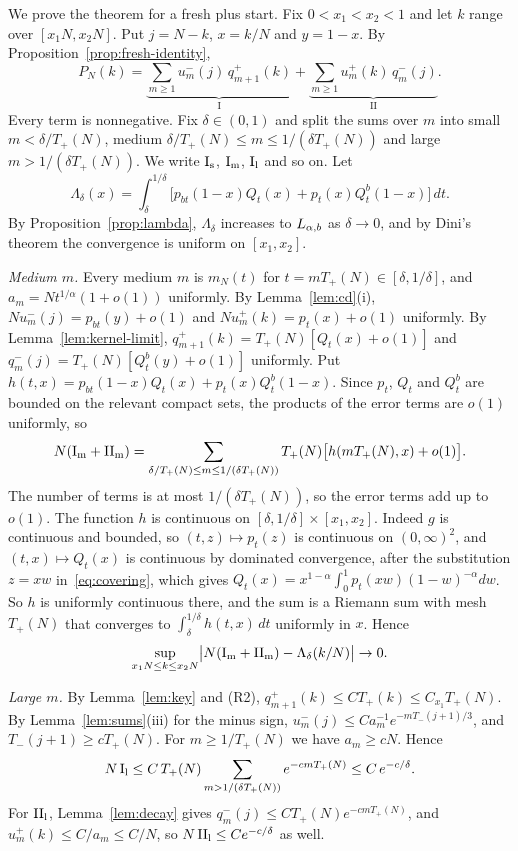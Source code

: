We prove the theorem for a fresh plus start. Fix
$0<x_1<x_2<1$ and let $k$ range over $[x_1N,x_2N]$. Put $j=N-k$, $x=k/N$ and $y=1-x$.
By Proposition~\ref{prop:fresh-identity},
\[
 P_N(k)=\underbrace{\sum_{m\ge1}u^\minus_m(j)\,q^\plus_{m+1}(k)}_{\mathrm{I}}
 +\underbrace{\sum_{m\ge1}u^\plus_m(k)\,q^\minus_m(j)}_{\mathrm{II}}.
\]
Every term is nonnegative. Fix $\delta\in(0,1)$ and split the sums over $m$ into small
$m<\delta/T_\plus(N)$, medium $\delta/T_\plus(N)\le m\le1/(\delta T_\plus(N))$ and large
$m>1/(\delta T_\plus(N))$. We write $\mathrm I_{\rm s}$, $\mathrm I_{\rm m}$, $\mathrm I_{\rm l}$
and so on. Let
\[
 \Lambda_\delta(x)=\int_\delta^{1/\delta}\bigl[p_{bt}(1-x)Q_t(x)+p_t(x)Q^b_t(1-x)\bigr]\,dt .
\]
By Proposition~\ref{prop:lambda}, $\Lambda_\delta$ increases to $L_{\alpha,b}$ as $\delta\to0$, and
by Dini's theorem the convergence is uniform on $[x_1,x_2]$.

\emph{Medium $m$.} Every medium $m$ is $m_N(t)$ for $t=mT_\plus(N)\in[\delta,1/\delta]$, and
$a_m=Nt^{1/\alpha}(1+o(1))$ uniformly. By Lemma~\ref{lem:cd}(i),
$Nu^\minus_m(j)=p_{bt}(y)+o(1)$ and $Nu^\plus_m(k)=p_t(x)+o(1)$ uniformly. By
Lemma~\ref{lem:kernel-limit}, $q^\plus_{m+1}(k)=T_\plus(N)[Q_t(x)+o(1)]$ and
$q^\minus_m(j)=T_\plus(N)[Q^b_t(y)+o(1)]$ uniformly. Put
$h(t,x)=p_{bt}(1-x)Q_t(x)+p_t(x)Q^b_t(1-x)$. Since $p_t$, $Q_t$ and $Q^b_t$ are bounded on
the relevant compact sets, the products of the error terms are $o(1)$ uniformly, so
\[
 N(\mathrm I_{\rm m}+\mathrm{II}_{\rm m})=\sum_{\delta/T_{+}(N)\le m\le1/(\delta T_{+}(N))}
 T_{+}(N)\bigl[h(mT_{+}(N),x)+o(1)\bigr].
\]
The number of terms is at most $1/(\delta T_\plus(N))$, so the error terms add up to $o(1)$.
The function $h$ is continuous on $[\delta,1/\delta]\times[x_1,x_2]$. Indeed $g$ is
continuous and bounded, so $(t,z)\mapsto p_t(z)$ is continuous on $(0,\infty)^2$, and
$(t,x)\mapsto Q_t(x)$ is continuous by dominated convergence, after the substitution
$z=xw$ in~\eqref{eq:covering}, which gives
$Q_t(x)=x^{1-\alpha}\int_0^1p_t(xw)(1-w)^{-\alpha}dw$. So $h$ is uniformly continuous there,
and the sum is a Riemann sum with mesh $T_\plus(N)$ that converges to $\int_\delta^{1/\delta}h(t,x)\,dt$
uniformly in $x$. Hence
\begin{equation}\label{eq:medium}
 \sup_{x_1N\le k\le x_2N}\bigl|N(\mathrm I_{\rm m}+\mathrm{II}_{\rm m})-\Lambda_\delta(k/N)\bigr|\to0 .
\end{equation}

\emph{Large $m$.} By Lemma~\ref{lem:key} and (R2), $q^\plus_{m+1}(k)\le CT_\plus(k)\le C_{x_1}T_\plus(N)$.
By Lemma~\ref{lem:sums}(iii) for the minus sign, $u^\minus_m(j)\le Ca_m^{-1}e^{-mT_\minus(j+1)/3}$, and
$T_\minus(j+1)\ge cT_\plus(N)$. For $m\ge1/T_\plus(N)$ we have $a_m\ge cN$. Hence
\[
 N\,\mathrm I_{\rm l}\le C\,T_{+}(N)\sum_{m>1/(\delta T_{+}(N))}e^{-cmT_{+}(N)}\le C\,e^{-c/\delta}.
\]
For $\mathrm{II}_{\rm l}$, Lemma~\ref{lem:decay} gives $q^\minus_m(j)\le CT_\plus(N)e^{-cmT_\plus(N)}$,
and $u^\plus_m(k)\le C/a_m\le C/N$, so $N\,\mathrm{II}_{\rm l}\le Ce^{-c/\delta}$ as well.

